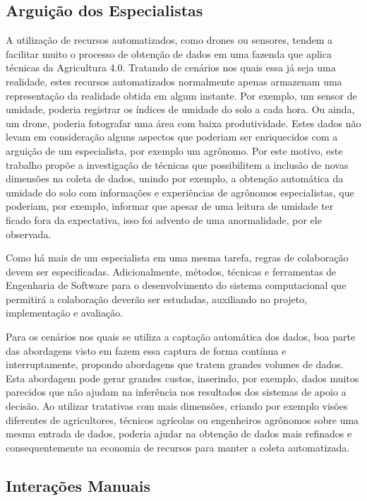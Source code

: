\documentclass[12pt]{article}
\begin{document}
\subsection{Arguição dos Especialistas}
\label{subsec:arquicao_especialistas}

A utilização de recursos automatizados, como drones ou sensores, tendem a facilitar muito o processo de obtenção de dados em uma fazenda que aplica técnicas da Agricultura 4.0. Tratando de cenários nos quais essa já seja uma realidade, estes recursos automatizados normalmente apenas armazenam uma representação da realidade obtida em algum instante. Por exemplo, um sensor de umidade, poderia registrar os índices de umidade do solo a cada hora. Ou ainda, um drone, poderia fotografar uma área com baixa produtividade. Estes dados não levam em consideração alguns aspectos que poderiam ser enriquecidos com a arguição de um especialista, por exemplo um agrônomo. Por este motivo, este trabalho propõe a investigação de técnicas que possibilitem a inclusão de novas dimensões na coleta de dados, unindo por exemplo, a obtenção automática da umidade do solo com informações e experiências de agrônomos especialistas, que poderiam, por exemplo, informar que apesar de uma leitura de umidade ter ficado fora da expectativa, isso foi advento de uma anormalidade, por ele observada. 

Como há mais de um especialista em uma mesma tarefa, regras de colaboração devem ser especificadas. Adicionalmente, métodos, técnicas e ferramentas de Engenharia de Software para o desenvolvimento do sistema computacional que permitirá a colaboração deverão ser estudadas, auxiliando no projeto, implementação e avaliação.

Para os cenários nos quais se utiliza a captação automática dos dados, boa parte das abordagens visto em \cite{Massruha:2017} fazem essa captura de forma contínua e interruptamente, propondo abordagens que tratem grandes volumes de dados. Esta abordagem pode gerar grandes custos, inserindo, por exemplo, dados muitos parecidos que não ajudam na inferência nos resultados dos sistemas de apoio a decisão. Ao utilizar tratativas com mais dimensões, criando por exemplo visões diferentes de agricultores, técnicos agrícolas ou engenheiros agrônomos sobre uma mesma entrada de dados, poderia ajudar na obtenção de dados mais refinados e consequentemente na economia de recursos para manter a coleta automatizada.

\subsection{Interações Manuais}
\label{subsec:interacoes_manuais}
\end{document}
